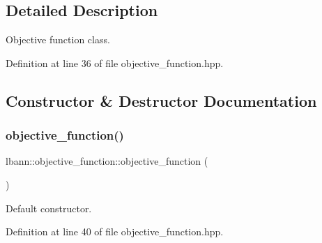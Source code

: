 \subsection{Detailed Description}
Objective function class. 

Definition at line 36 of file objective\+\_\+function.\+hpp.



\subsection{Constructor \& Destructor Documentation}
\mbox{\label{classlbann_1_1objective__function_a89e96fddff19f13a6d3acafe4394fd65}} 
\subsubsection{\texorpdfstring{objective\+\_\+function()}{objective\_function()}\hspace{0.1cm}{\footnotesize\ttfamily [1/2]}}
{\footnotesize\ttfamily lbann\+::objective\+\_\+function\+::objective\+\_\+function (\begin{DoxyParamCaption}{ }\end{DoxyParamCaption})\hspace{0.3cm}{\ttfamily [inline]}}

Default constructor. 

Definition at line 40 of file objective\+\_\+function.\+hpp.


